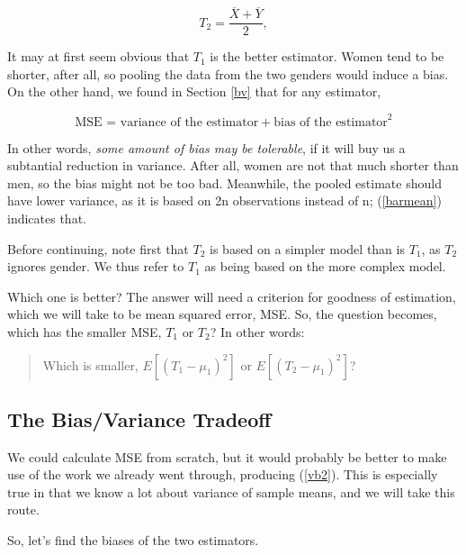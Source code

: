 \begin{equation}
T_2 = \frac{\overline{X}+\overline{Y}}{2}, 
\end{equation}

It may at first seem obvious that $T_1$ is the better estimator.  Women
tend to be shorter, after all, so pooling the data from the two genders
would induce a bias.  On the other hand, we found in Section \ref{bv}
that for any estimator,

\begin{equation}
\textrm{MSE = variance of the estimator} + \textrm{bias of the
estimator} ^2
\end{equation}

In other words, {\it some amount of bias may be tolerable}, if it will
buy us a subtantial reduction in variance.  After all, women are not
that much shorter than men, so the bias might not be too bad.
Meanwhile, the pooled estimate should have lower variance, as it is
based on 2n observations instead of n; (\ref{barmean}) indicates that.

Before continuing, note first that $T_2$ is based on a simpler model
than is $T_1$, as $T_2$ ignores gender.  We thus refer to $T_1$ as being
based on the more complex model.

Which one is better?  The answer will need a criterion for
goodness of estimation, which we will take to be mean squared error,
MSE.  So, the question becomes, which has the smaller MSE, $T_1$ or
$T_2$?  In other words:

\begin{quote}
Which is smaller, $E[(T_1 - \mu_1)^2]$ or $E[(T_2 - \mu_1)^2]$?
\end{quote}

\subsection{The Bias/Variance Tradeoff}
\label{biasvartradeoff}

We could calculate MSE from scratch, but it would probably be better to
make use of the work we already went through, producing (\ref{vb2}).
This is especially true in that we know a lot about variance of sample
means, and we will take this route.

So, let's find the biases of the two estimators.

